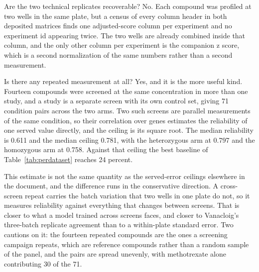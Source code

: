 Are the two technical replicates recoverable? No. Each compound was profiled at two wells in
the same plate, but a census of every column header in both deposited matrices finds one
adjusted-score column per experiment and no experiment id appearing twice. The two wells are
already combined inside that column, and the only other column per experiment is the companion
z score, which is a second normalization of the same numbers rather than a second measurement.

Is there any repeated measurement at all? Yes, and it is the more useful kind. Fourteen
compounds were screened at the same concentration in more than one study, and a study is a
separate screen with its own control set, giving 71 condition pairs across the two arms. Two
such screens are parallel measurements of the same condition, so their correlation over genes
estimates the reliability of one served value directly, and the ceiling is its square root.
The median reliability is 0.611 and the median ceiling 0.781, with the heterozygous arm at
0.797 and the homozygous arm at 0.758. Against that ceiling the best baseline of
Table~\ref{tab:perdataset} reaches 24 percent.

This estimate is not the same quantity as the served-error ceilings elsewhere in the document,
and the difference runs in the conservative direction. A cross-screen repeat carries the batch
variation that two wells in one plate do not, so it measures reliability against everything
that changes between screens. That is closer to what a model trained across screens faces, and
closer to Vanacloig's three-batch replicate agreement than to a within-plate standard error.
Two cautions on it: the fourteen repeated compounds are the ones a screening campaign repeats,
which are reference compounds rather than a random sample of the panel, and the pairs are
spread unevenly, with methotrexate alone contributing 30 of the 71.

\begin{table}[htbp]
\centering
\footnotesize
\caption{Recovering a ceiling for Hoepfner. Experiments deposited and repeated columns come
from a census of every column header in the two score matrices: no experiment appears twice,
so the technical replicates are not separately deposited. The condition pairs are the same
compound at the same concentration in two different studies; for parallel measurements the
observed correlation estimates the reliability of one value and the ceiling is its square
root. The last column is the best baseline of Table~\ref{tab:perdataset} as a fraction of that
ceiling.}
\label{tab:hoepfnerceiling}

\end{table}

